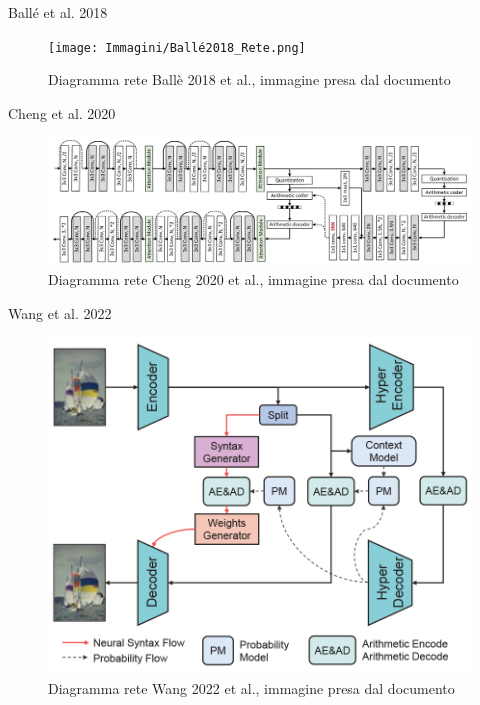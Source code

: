    \begin{frame}{Ballé et al. 2018}
        \begin{figure}[!h]
            \centering
            \texttt{[image: Immagini/Ballé2018\_Rete.png]}
            \caption{Diagramma rete Ballè 2018 et al., immagine presa dal documento \cite{minnen2018joint}}
            \label{fig:balle2018Network}
        \end{figure}
    \end{frame}

    \begin{frame}{Cheng et al. 2020}
        \begin{figure}[!h]
            \centering
            \includegraphics[width=1\textwidth]{Immagini/Cheng2020_Rete.png}
            \caption{Diagramma rete Cheng 2020 et al., immagine presa dal documento \cite{cheng2020learned}}
            \label{fig:cheng2020Network}
        \end{figure}
    \end{frame}

    \begin{frame}{Wang et al. 2022}
        \begin{figure}[!h]
            \centering
            \includegraphics[width=0.6\textheight]{Immagini/Wang2022_Rete.png}
            \caption{Diagramma rete Wang 2022 et al., immagine presa dal documento \cite{wang2022neural}}
            \label{fig:Wang2022Network}
        \end{figure}
    \end{frame}
    